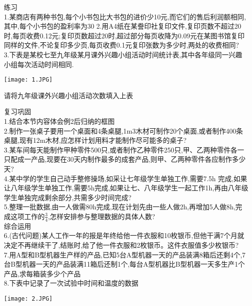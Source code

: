 \documentclass[11pt,apaper]{article}
\begin{document}
\begin{exercise}
练习\\

1.某商店有两种书包,每个小书包比大书包的进价少10元,而它们的售后利润额相同,其中,每个小书包的盈利率为30%
2.用A4纸在某誊印社复印文件,复印页数不超过20时,每页收费0.12元;复印页数超过20时,超过部分每页收降为0.09元在某图书馆复印同样的文件,不论复印多少页,每页收费0.1元复印张数为多少时,两处的收费相同?\\
3.下表是某校七至九年级某月课外兴趣小组活动时间统计表,其中各年级同一兴趣小组每次活动时间相同.\\
\begin{center}
  \texttt{[image: 1.JPG]}\\
\end{center}


请将九年级课外兴趣小组活动次数填入上表



复习巩固\\

1.结合本节内容体会例2后归纳的框图\\
2.制作一张桌子要用一个桌面和4条桌腿,1m3木材可制作20个桌面,或者制作400条桌腿,现有12m木材,应怎样计划用料才能制作尽可能多的桌子?\\
3.某车间每天能制作甲种零件500只,或者制作乙种零件250只,甲、乙两种零件各一只配成一产品,现要在30天内制作最多的成套产品,则甲、乙两种零件各应制作多少天?\\
4.某中学的学生自己动手整修操场,如采让七年级学生单独工作,需要7.5h 完成,如果让八年级学生单独工作,需要5h完成,如果让七、八年级学生一起工作1h,再由八年级学生单独完成剩余部分,共需多少时间完成?\\
5.整理一批数据,由一人做需80h完成,现在计划先由一些人做2h,再增加5人做8h,完成这项工作的$\frac{3}{4}$,怎样安排参与整理数据的具体人数?\\



综合运用\\

6.(古代问题)某人工作一年的报是年终给他一件衣服和10枚银币,但他干满7个月就决定不再继续干了,结账时,给了他一件衣服和2枚银币。这件衣服值多少枚银币?\\
7.用A型和B型机器生产样的产品,已知5台A型机器一天的产品装满8箱后还剩4个,7台B型机器一天的产品装满11箱后还制1个,每台A型机器比B型机器一天多生产1个产品,求每箱装多少个产品\\
8.下表中记录了一次试验中时间和温度的数据\\
\begin{center}
  \texttt{[image: 2.JPG]}\\
\end{center}


\end{exercise}
\end{document}
